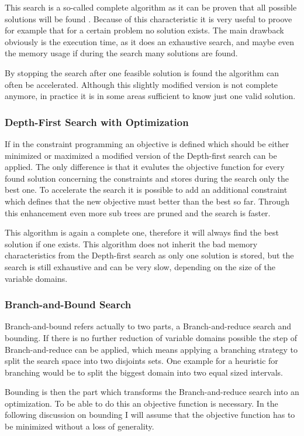 \documentclass[10pt,
               a4paper,
               journal,
               ]{IEEEtran}
\begin{document}
	This search is a so-called complete algorithm as it can be proven that all possible solutions will be found \cite[p.~85]{handbookCP}. Because of this characteristic it is very useful to proove for example that for a certain problem no solution exists. The main drawback obviously is the execution time, as it does an exhaustive search, and maybe even the memory usage if during the search many solutions are found.
	
	By stopping the search after one feasible solution is found the algorithm can often be accelerated. Although this slightly modified version is not complete anymore, in practice it is in some areas sufficient to know just one valid solution.
	
	\subsubsection{Depth-First Search with Optimization}
	If in the constraint programming an objective is defined which should be either minimized or maximized a modified version of the Depth-first search can be applied. The only difference is that it evalutes the objective function for every found solution concerning the constraints and stores during the search only the best one. To accelerate the search it is possible to add an additional constraint which defines that the new objective must better than the best so far. Through this enhancement even more sub trees are pruned and the search is faster.
	
	This algorithm is again a complete one, therefore it will always find the best solution if one exists. This algorithm does not inherit the bad memory characteristics from the Depth-first search as only one solution is stored, but the search is still exhaustive and can be very slow, depending on the size of the variable domains.
	
	\subsubsection{Branch-and-Bound Search}
	Branch-and-bound refers actually to two parts, a Branch-and-reduce search and bounding. If there is no further reduction of variable domains possible the step of Branch-and-reduce can be applied, which means applying a branching strategy to split the search space into two disjoints sets. One example for a heuristic for branching would be to split the biggest domain into two equal sized intervals.
	
	Bounding is then the part which transforms the Branch-and-reduce search into an optimization. To be able to do this an objective function is necessary. In the following discussion on bounding I will assume that the objective function has to be minimized without a loss of generality.
	
\end{document}
